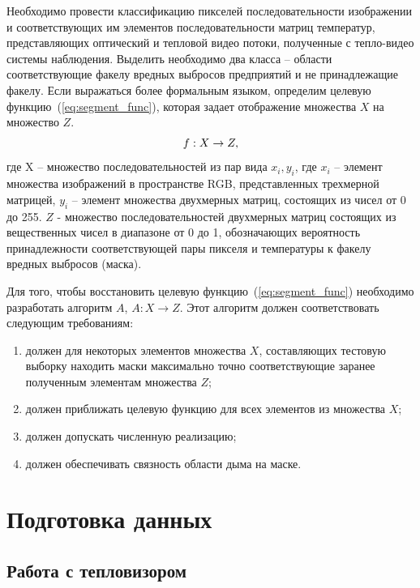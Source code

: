 \documentclass[14pt, a4paper]{extreport}
\begin{document}
	Необходимо провести классификацию пикселей последовательности изображении и соответствующих им элементов последовательности матриц температур, представляющих оптический и тепловой видео потоки, полученные с тепло-видео системы наблюдения. Выделить необходимо два класса -- области соответствующие факелу вредных выбросов предприятий и не принадлежащие факелу. Если выражаться более формальным языком, определим целевую функцию~(\ref{eq:segment_func}), которая задает отображение множества $X$ на множество $Z$.
	\vspace*{-0.2cm}
	\begin{equation}
		f: X \rightarrow Z,
		\label{eq:segment_func}
		\vspace*{-0.4cm}
	\end{equation}
	где X -- множество последовательностей из пар вида $x_i, y_i$, где $x_i$ -- элемент множества изображений в пространстве RGB, представленных трехмерной матрицей, $y_i$ -- элемент множества двухмерных матриц, состоящих из чисел от 0 до 255. $Z$ - множество последовательностей двухмерных матриц состоящих из вещественных чисел в диапазоне от 0 до 1, обозначающих вероятность принадлежности соответствующей пары пикселя и температуры к факелу вредных выбросов (маска).
	
	Для того, чтобы восстановить целевую функцию~(\ref{eq:segment_func}) необходимо разработать алгоритм $A$, $A: X \rightarrow Z$. Этот алгоритм должен соответствовать следующим требованиям:
	\begin{enumerate}[label={\arabic*)}]
		\item должен для некоторых элементов множества $X$, составляющих тестовую выборку находить маски максимально точно соответствующие заранее полученным элементам множества $Z$;
		\item должен приближать целевую функцию для всех элементов из множества $X$;
		\item должен допускать численную реализацию;
		\item должен обеспечивать связность области дыма на маске.
	\end{enumerate}

\section{Подготовка данных}
\subsection{Работа с тепловизором}
\end{document}
